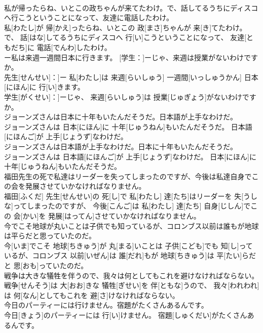 \documentclass[8pt]{extreport}
\begin{document}
\begin{CJK}{UTF8}{min}
\\	私が帰ったらね、いとこの政ちゃんが来てたわけ。で、話してるうちにディスコへ行こうということになって、友達に電話したわけ。	
\\	私[わたし]が 帰[かえ]ったらね、いとこの 政[まさ]ちゃんが 来[き]てたわけ。で、 話[はな]してるうちにディスコへ 行[い]こうということになって、 友達[ともだち]に 電話[でんわ]したわけ。
\\	[先生：]ー私は来週一週間日本に行きます。 [学生：]ーじゃ、来週は授業がないわけですか。	
\\	先生[せんせい]：]ー 私[わたし]は 来週[らいしゅう] 一週間[いっしゅうかん] 日本[にほん]に 行[い]きます。 
\\	学生[がくせい]：]ーじゃ、 来週[らいしゅう]は 授業[じゅぎょう]がないわけですか。
\\	ジョーンズさんは日本に十年もいたんだそうだ。日本語が上手なわけだ。	
\\	ジョーンズさんは 日本[にほん]に 十年[じゅうねん]もいたんだそうだ。 日本語[にほんご]が 上手[じょうず]なわけだ。
\\	ジョーンズさんは日本語が上手なわけだ。日本に十年もいたんだそうだ。	
\\	ジョーンズさんは 日本語[にほんご]が 上手[じょうず]なわけだ。 日本[にほん]に 十年[じゅうねん]もいたんだそうだ。
\\	福田先生の死で私達はリーダーを失ってしまったのですが、今後は私達自身でこの会を発展させていかなければなりません。	
\\	福田[ふくだ] 先生[せんせい]の 死[し]で 私[わたし] 達[たち]はリーダーを 失[うしな]ってしまったのですが、 今後[こんご]は 私[わたし] 達[たち] 自身[じしん]でこの 会[かい]を 発展[はってん]させていかなければなりません。
\\	今でこそ地球が丸いことは子供でも知っているが、コロンブス以前は誰もが地球は平らだと思っていたのだ。	
\\	今[いま]でこそ 地球[ちきゅう]が 丸[まる]いことは 子供[こども]でも 知[し]っているが、コロンブス 以前[いぜん]は 誰[だれ]もが 地球[ちきゅう]は 平[たい]らだと 思[おも]っていたのだ。
\\	戦争は大きな犠牲を伴うので、我々は何としてもこれを避けなければならない。	
\\	戦争[せんそう]は 大[おお]きな 犠牲[ぎせい]を 伴[ともな]うので、 我々[われわれ]は 何[なん]としてもこれを 避[さ]けなければならない。
\\	今日のパーティーには行けません。宿題がたくさんあるんです。	
\\	今日[きょう]のパーティーには 行[い]けません。 宿題[しゅくだい]がたくさんあるんです。

\end{CJK}
\end{document}
